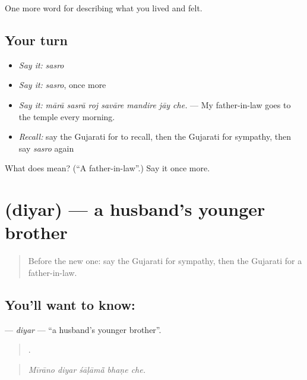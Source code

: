 \begin{grammarlens}[title={What you've built}]
One more word for describing what you lived and felt.
\end{grammarlens}

\subsection*{Your turn}
\begin{itemize}
\raggedright
  \item \emph{Say it:} \emph{sasro}
  \item \emph{Say it:} \emph{sasro}, once more
  \item \emph{Say it:} \emph{mārā sasrā roj savāre mandire jāy che.} — My father-in-law goes to the temple every morning.
  \item \emph{Recall:} say the Gujarati for to recall, then the Gujarati for sympathy, then say \emph{sasro} again
\end{itemize}

\begin{tcolorbox}[breakable,colback=teal!4,colframe=teal!35!black,title={Before you move on}]
What does  mean? (\textquotedblleft{}A father-in-law\textquotedblright{}.) Say it once more.
\end{tcolorbox}
\section[\texorpdfstring{\gu{દિયર} (diyar)}{દિયર (diyar)}]{ (diyar) — a husband's younger brother}

\label{lesson:GU-C490-diyar}



\begin{quote}
Before the new one: say the Gujarati for sympathy, then the Gujarati for a father-in-law.
\end{quote}

\subsection*{You'll want to know: }
\textbf{} — \emph{diyar} — \textquotedblleft{}a husband's younger brother\textquotedblright{}.

\begin{quote}
    .
\end{quote}

\begin{quote}
\emph{Mīrāno diyar śāḷāmā̃ bhaṇe che.}
\end{quote}

